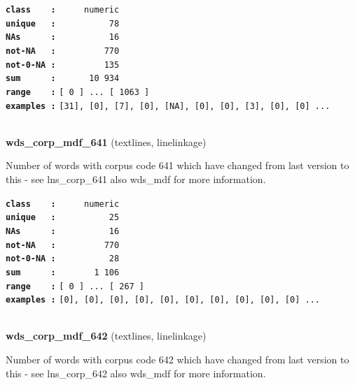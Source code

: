 \documentclass[]{article}
\begin{document}
\textbf{\texttt{class\ \ \ \ :}} \texttt{~~~~~numeric}\\
\textbf{\texttt{unique\ \ \ :}} \texttt{~~~~~~~~~~78}\\
\textbf{\texttt{NAs\ \ \ \ \ \ :}} \texttt{~~~~~~~~~~16}\\
\textbf{\texttt{not-NA\ \ \ :}} \texttt{~~~~~~~~~770}\\
\textbf{\texttt{not-0-NA\ :}} \texttt{~~~~~~~~~135}\\
\textbf{\texttt{sum\ \ \ \ \ \ :}} \texttt{~~~~~~10~934}\\
\textbf{\texttt{range\ \ \ \ :}}
\texttt{{[}\ 0\ {]}\ ...\ {[}\ 1063\ {]}}\\
\textbf{\texttt{examples\ :}}
\texttt{{[}31{]},\ {[}0{]},\ {[}7{]},\ {[}0{]},\ {[}NA{]},\ {[}0{]},\ {[}0{]},\ {[}3{]},\ {[}0{]},\ {[}0{]}\ ...}\\

~

\textbf{wds\_corp\_mdf\_641} (textlines, linelinkage)

Number of words with corpus code 641 which have changed from last
version to this - see lns\_corp\_641 also wds\_mdf for more information.

\textbf{\texttt{class\ \ \ \ :}} \texttt{~~~~~numeric}\\
\textbf{\texttt{unique\ \ \ :}} \texttt{~~~~~~~~~~25}\\
\textbf{\texttt{NAs\ \ \ \ \ \ :}} \texttt{~~~~~~~~~~16}\\
\textbf{\texttt{not-NA\ \ \ :}} \texttt{~~~~~~~~~770}\\
\textbf{\texttt{not-0-NA\ :}} \texttt{~~~~~~~~~~28}\\
\textbf{\texttt{sum\ \ \ \ \ \ :}} \texttt{~~~~~~~1~106}\\
\textbf{\texttt{range\ \ \ \ :}}
\texttt{{[}\ 0\ {]}\ ...\ {[}\ 267\ {]}}\\
\textbf{\texttt{examples\ :}}
\texttt{{[}0{]},\ {[}0{]},\ {[}0{]},\ {[}0{]},\ {[}0{]},\ {[}0{]},\ {[}0{]},\ {[}0{]},\ {[}0{]},\ {[}0{]}\ ...}\\

~

\textbf{wds\_corp\_mdf\_642} (textlines, linelinkage)

Number of words with corpus code 642 which have changed from last
version to this - see lns\_corp\_642 also wds\_mdf for more information.
\end{document}
